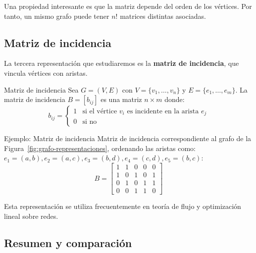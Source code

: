 Una propiedad interesante es que la matriz depende del orden de los vértices. Por tanto, un mismo grafo puede tener \( n! \) matrices distintas asociadas.

\subsection{Matriz de incidencia}

La tercera representación que estudiaremos es la \textbf{matriz de incidencia}, que vincula vértices con aristas.

\begin{definitionblock}{Matriz de incidencia}
Sea \( G = (V, E) \) con \( V = \{v_1, \ldots, v_n\} \) y \( E = \{e_1, \ldots, e_m\} \). La matriz de incidencia \( B = [b_{ij}] \) es una matriz \( n \times m \) donde:
\[
b_{ij} =
\begin{cases}
1 & \text{si el vértice } v_i \text{ es incidente en la arista } e_j \\
0 & \text{si no}
\end{cases}
\]
\end{definitionblock}

\begin{exampleblock}{Ejemplo: Matriz de incidencia}
Matriz de incidencia correspondiente al grafo de la Figura~\ref{fig:grafo-representaciones}, ordenando las aristas como: \( e_1 = (a,b), e_2 = (a,c), e_3 = (b,d), e_4 = (c,d), e_5 = (b,c) \):
\[
B = \begin{bmatrix}
1 & 1 & 0 & 0 & 0 \\
1 & 0 & 1 & 0 & 1 \\
0 & 1 & 0 & 1 & 1 \\
0 & 0 & 1 & 1 & 0
\end{bmatrix}
\]
\end{exampleblock}

Esta representación se utiliza frecuentemente en teoría de flujo y optimización lineal sobre redes.

\subsection*{Resumen y comparación}

\begin{center}
\end{center}

